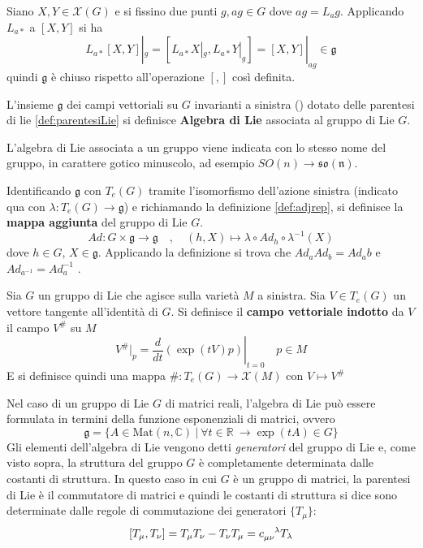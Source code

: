 Siano $X,Y \in \mathcal{X}(G)$ e si fissino due punti $g, ag \in G$ dove
$ag = L_a g$. Applicando $L_{a*}$ a $[X,Y]$ si ha
$$
   L_{a*}[X,Y]|_g = [L_{a*}X|_g,L_{a*}Y|_g] = [X,Y]|_{ag} \in \mathfrak{g}
$$
quindi $\mathfrak{g}$ è chiuso rispetto all'operazione $[,]$ così definita.\\

\begin{definition}\label{}
   L'insieme $\mathfrak{g}$ dei campi vettoriali su $G$ invarianti a sinistra ()
   dotato delle parentesi di lie \ref{def:parentesiLie} si definisce
   \textbf{Algebra di Lie} associata al gruppo di Lie $G$.
\end{definition}
L'algebra di Lie associata a un gruppo viene indicata con lo stesso nome del gruppo,
in carattere gotico minuscolo, ad esempio $SO(n)\to \mathfrak{so(n)}$.\\

\begin{definition}
   Identificando $\mathfrak{g}$ con $T_e(G)$ tramite l'isomorfismo dell'azione sinistra
   (indicato qua con $\lambda : T_e(G) \to \mathfrak{g}$) e richiamando la definizione
   \ref{def:adjrep}, si definisce la \textbf{mappa aggiunta} del gruppo di Lie $G$.
   $$
      Ad : G \times \mathfrak{g} \to \mathfrak{g} \quad , \quad
      (h,X) \mapsto \lambda \circ Ad_h \circ \lambda^{-1}(X)
   $$
   dove $h \in G$, $X \in \mathfrak{g}$.
   Applicando la definizione si trova che $Ad_a Ad_b = Ad_ab$ e $Ad_{a^{-1}} = Ad_a^{-1}$ .\\
\end{definition}

\begin{definition}\label{def:inducedvectfield}
   Sia $G$ un gruppo di Lie che agisce sulla varietà $M$ a sinistra. Sia $V \in T_e(G)$
   un vettore tangente all'identità di $G$.
   Si definisce il \textbf{campo vettoriale indotto} da $V$ il campo $V^\#$ su $M$
   $$
      V^\# |_p = \left. \frac{d}{dt} (\exp(tV)p) \right |_{t=0} \quad p \in M
   $$
   E si definisce quindi una mappa $\# : T_e(G) \to \mathcal{X}(M)$
   con $V \mapsto V^\#$
\end{definition}

Nel caso di un gruppo di Lie $G$ di matrici reali, l'algebra di Lie può essere
formulata in termini della funzione esponenziali di matrici, ovvero
$$
\mathfrak{g} = \{ A \in \mathrm{Mat}(n,\mathbb{C}) \: | \:
\forall t \in \mathbb{R} \:\to \exp (tA) \in G \}
$$
Gli elementi dell'algebra di Lie vengono detti \emph{generatori} del gruppo di Lie
e, come visto sopra, la struttura del gruppo $G$ è completamente determinata
dalle costanti di struttura. In questo caso in cui $G$ è un gruppo di matrici,
la parentesi di Lie è il commutatore di matrici e quindi le costanti di struttura
si dice sono determinate dalle regole di commutazione dei generatori $\{T_\mu\}$:
$$
   [T_\mu, T_\nu] = T_\mu T_\nu - T_\nu T_\mu
      = c_{\mu\nu}^{\hphantom{\mu\nu}\lambda} T_\lambda
$$

